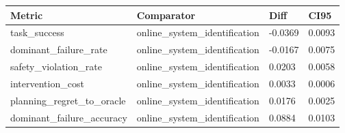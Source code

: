\begin{tabular}{llll}
\toprule
Metric & Comparator & Diff & CI95 \\
\midrule
task\_success & online\_system\_identification & -0.0369 & 0.0093 \\
dominant\_failure\_rate & online\_system\_identification & -0.0167 & 0.0075 \\
safety\_violation\_rate & online\_system\_identification & 0.0203 & 0.0058 \\
intervention\_cost & online\_system\_identification & 0.0033 & 0.0006 \\
planning\_regret\_to\_oracle & online\_system\_identification & 0.0176 & 0.0025 \\
dominant\_failure\_accuracy & online\_system\_identification & 0.0884 & 0.0103 \\
\bottomrule
\end{tabular}
